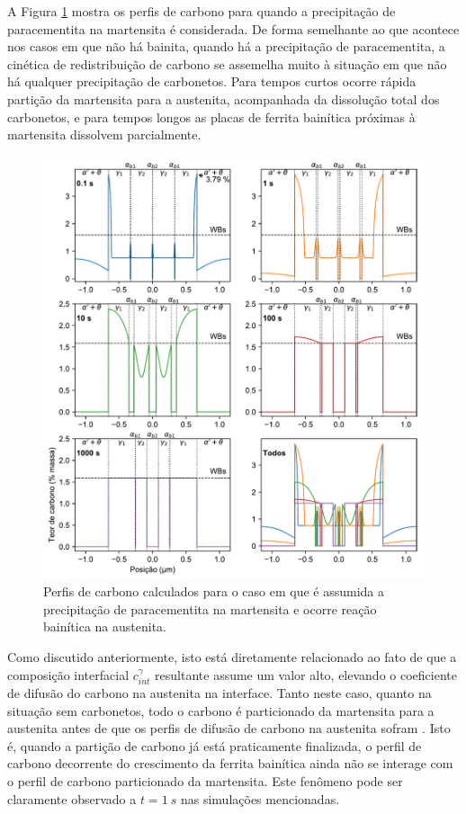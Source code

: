 A Figura \ref{fig:cprofiles_coupled_CCEpara} mostra os perfis de carbono para quando a precipitação de paracementita na martensita é considerada. De forma semelhante ao que acontece nos casos em que não há bainita, quando há a precipitação de paracementita, a cinética de redistribuição de carbono se assemelha muito à situação em que não há qualquer precipitação de carbonetos. Para tempos curtos ocorre rápida partição da martensita para a austenita, acompanhada da dissolução total dos carbonetos, e para tempos longos as placas de ferrita bainítica próximas à martensita dissolvem parcialmente.

\begin{figure}
  \includegraphics[width=.9\textwidth]{img/cpartition/cprofiles/coupled_FoFo_375_CCEpara_sep.pdf}
  \caption{Perfis de carbono calculados para o caso em que é assumida a precipitação de paracementita na martensita e ocorre reação bainítica na austenita.}
  \label{fig:cprofiles_coupled_CCEpara}
\end{figure}

Como discutido anteriormente, isto está diretamente relacionado ao fato de que a composição interfacial $c^\gamma_{int}$ resultante assume um valor alto, elevando o coeficiente de difusão do carbono na austenita na interface. Tanto neste caso, quanto na situação sem carbonetos, todo o carbono é particionado da martensita para a austenita antes de que os perfis de difusão de carbono na austenita sofram . Isto é, quando a partição de carbono já está praticamente finalizada, o perfil de carbono decorrente do crescimento da ferrita bainítica ainda não se interage com o perfil de carbono particionado da martensita. Este fenômeno pode ser claramente observado a $t = \SI{1}{s}$ nas simulações mencionadas. 

